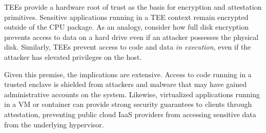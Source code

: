 


TEEs provide a hardware root of trust as the basis for encryption and attestation primitives. Sensitive applications running in a TEE context remain encrypted outside of the CPU package. As an analogy, consider how full disk encryption prevents access to data on a hard drive even if an attacker possesses the physical disk. Similarly, TEEs prevent access to code and data \textit{in execution}, even if the attacker has elevated privileges on the host. 

Given this premise, the implications are extensive. Access to code running in a trusted enclave is shielded from attackers and malware that may have gained administrative accounts on the system. Likewise, virtualized applications running in a VM or container can provide strong security guarantees to clients through attestation, preventing public cloud IaaS providers from accessing sensitive data from the underlying hypervisor. 







